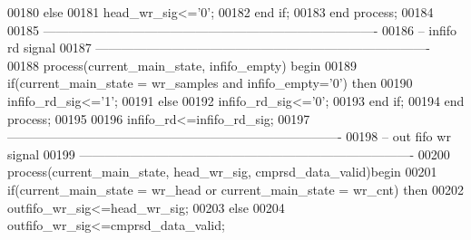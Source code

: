 \begin{DoxyCode}
00180     \textcolor{keywordflow}{else}
00181         \textcolor{vhdlchar}{head_wr_sig}\textcolor{vhdlchar}{<=}\textcolor{vhdlchar}{'}\textcolor{vhdllogic}{}\textcolor{vhdllogic}{0}\textcolor{vhdlchar}{'};
00182     \textcolor{keywordflow}{end} \textcolor{keywordflow}{if};
00183 \textcolor{keywordflow}{end} \textcolor{keywordflow}{process}; 
00184 
00185 \textcolor{keyword}{-------------------------------------------------------------------------------}
00186 \textcolor{keyword}{-- infifo rd  signal}
00187 \textcolor{keyword}{-------------------------------------------------------------------------------  }
00188  \textcolor{keywordflow}{process}(current_main_state, infifo_empty) \textcolor{keywordflow}{begin}
00189     \textcolor{keywordflow}{if}\textcolor{vhdlchar}{(}\textcolor{vhdlchar}{current_main_state} \textcolor{vhdlchar}{=} \textcolor{vhdlchar}{wr\_samples} \textcolor{keywordflow}{and} \textcolor{vhdlchar}{infifo_empty}\textcolor{vhdlchar}{=}\textcolor{vhdlchar}{'}\textcolor{vhdllogic}{}\textcolor{vhdllogic}{0}\textcolor{vhdlchar}{'}\textcolor{vhdlchar}{)} \textcolor{keywordflow}{then}
00190         \textcolor{vhdlchar}{infifo_rd_sig}\textcolor{vhdlchar}{<=}\textcolor{vhdlchar}{'}\textcolor{vhdllogic}{}\textcolor{vhdllogic}{1}\textcolor{vhdlchar}{'};
00191     \textcolor{keywordflow}{else}
00192         \textcolor{vhdlchar}{infifo_rd_sig}\textcolor{vhdlchar}{<=}\textcolor{vhdlchar}{'}\textcolor{vhdllogic}{}\textcolor{vhdllogic}{0}\textcolor{vhdlchar}{'};
00193     \textcolor{keywordflow}{end} \textcolor{keywordflow}{if};
00194 \textcolor{keywordflow}{end} \textcolor{keywordflow}{process}; 
00195 
00196 \textcolor{vhdlchar}{infifo_rd}\textcolor{vhdlchar}{<=}\textcolor{vhdlchar}{infifo_rd_sig};
00197 \textcolor{keyword}{-------------------------------------------------------------------------------}
00198 \textcolor{keyword}{-- out fifo wr signal}
00199 \textcolor{keyword}{-------------------------------------------------------------------------------  }
00200  \textcolor{keywordflow}{process}(current_main_state, head_wr_sig, cmprsd_data_valid)\textcolor{keywordflow}{begin}
00201     \textcolor{keywordflow}{if}\textcolor{vhdlchar}{(}\textcolor{vhdlchar}{current_main_state} \textcolor{vhdlchar}{=} \textcolor{vhdlchar}{wr\_head} \textcolor{keywordflow}{or} \textcolor{vhdlchar}{current_main_state} \textcolor{vhdlchar}{=} \textcolor{vhdlchar}{wr\_cnt}\textcolor{vhdlchar}{)} \textcolor{keywordflow}{then}
00202         \textcolor{vhdlchar}{outfifo_wr_sig}\textcolor{vhdlchar}{<=}\textcolor{vhdlchar}{head_wr_sig};
00203     \textcolor{keywordflow}{else}
00204         \textcolor{vhdlchar}{outfifo_wr_sig}\textcolor{vhdlchar}{<=}\textcolor{vhdlchar}{cmprsd_data_valid};

\end{DoxyCode}
